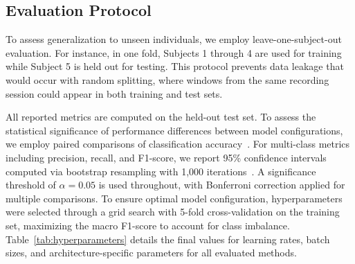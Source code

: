 \documentclass[acmtog, nonacm]{acmart}
\begin{document}
\subsection{Evaluation Protocol}

To assess generalization to unseen individuals, we employ leave-one-subject-out evaluation. For instance, in one fold, Subjects 1 through 4 are used for training while Subject 5 is held out for testing. This protocol prevents data leakage that would occur with random splitting, where windows from the same recording session could appear in both training and test sets.

All reported metrics are computed on the held-out test set. To assess the statistical significance of performance differences between model configurations, we employ paired comparisons of classification accuracy~\cite{demsar2006statistical}. For multi-class metrics including precision, recall, and F1-score, we report 95\% confidence intervals computed via bootstrap resampling with 1,000 iterations~\cite{lehmann2006testing}. A significance threshold of $\alpha = 0.05$ is used throughout, with Bonferroni correction applied for multiple comparisons. 
To ensure optimal model configuration, hyperparameters were selected through a grid search with 5-fold cross-validation on the training set, maximizing the macro F1-score to account for class imbalance.
Table~\ref{tab:hyperparameters} details the final values for learning rates, batch sizes, and architecture-specific parameters for all evaluated methods.
\end{document}
